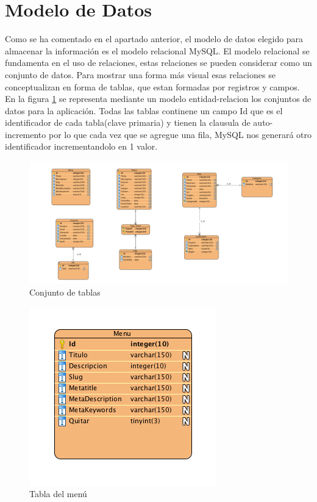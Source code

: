 \section{Modelo de Datos}

Como se ha comentado en el apartado anterior, el modelo de datos elegido para almacenar la información es el modelo relacional MySQL. El modelo relacional se fundamenta en el uso de relaciones, estas relaciones se pueden considerar como un conjunto de datos. Para mostrar una forma más visual esas relaciones se conceptualizan en forma de tablas, que estan formadas por registros y campos. En la figura \ref{tablas_bd} se representa mediante un modelo entidad-relacion los conjuntos de datos para la aplicación. Todas las tablas continene un campo Id que es el identificador de cada tabla(clave primaria) y tienen la clausula de auto-incremento por lo que cada vez que se agregue una fila, MySQL nos generará otro identificador incrementandolo en 1 valor.

\begin{figure}
\begin{center}
\includegraphics[width=1.0\textwidth]{imagenes/E-R.png}
\caption{Conjunto de tablas}
\label{tablas_bd}
\end{center}
\end{figure}

\begin{figure}
\begin{center}
\includegraphics[scale=0.7]{imagenes/menu.png}
\caption{Tabla del menú}
\label{menu_bd}
\end{center}
\end{figure}

